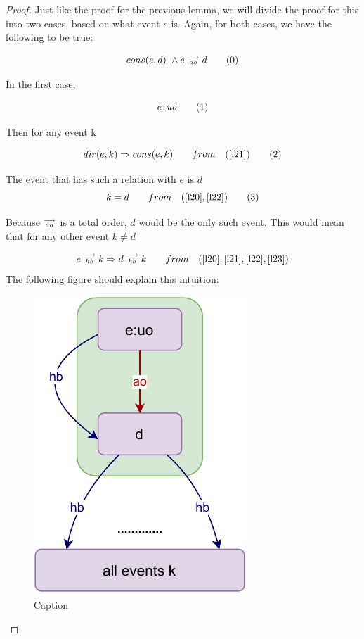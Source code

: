     \begin{proof}
        
        Just like the proof for the previous lemma, we will divide the proof for this into two cases, based on what event $e$ is. Again, for both cases, we have the following to be true:
        
        \[
            cons(e,d) \ \wedge e\stackrel{\longrightarrow}{_{ao}}d
            \tag{0}
            \label{l20}
        \]
    
       In the first case,
       
       \[
            e\!:\!\textit{uo} 
            \tag{1}
            \label{l21}
       \]
       
       Then for any event k
       
       \[
            dir(e,k) \Rightarrow cons(e,k) 
            \qquad from
            \quad (\ref{l21})
            \tag{2}
            \label{l22}
       \]
       
       The event that has such a relation with $e$ is $d$
       \[
            k = d 
            \qquad from 
            \quad (\ref{l20}, \ref{l22})
            \tag{3}
            \label{l23}
       \]
       
       Because $\stackrel{\longrightarrow}{_{ao}}$ is a total order, $d$ would be the only such event. This would mean that for any other event $k \neq d$
       
       \[
            e\stackrel{\longrightarrow}{_{hb}}k \Rightarrow d\stackrel{\longrightarrow}{_{hb}}k
            \qquad from 
            \quad (\ref{l20}, \ref{l21}, \ref{l22}, \ref{l23})
       \]
       The following figure should explain this intuition:  
        
        \begin{figure}[H]
            \centering
            \includegraphics[scale=0.7]{Lemma_Proof2_Case1.pdf}
            \caption{Caption}
            \label{fig:my_label}
        \end{figure}
        

\end{proof}
